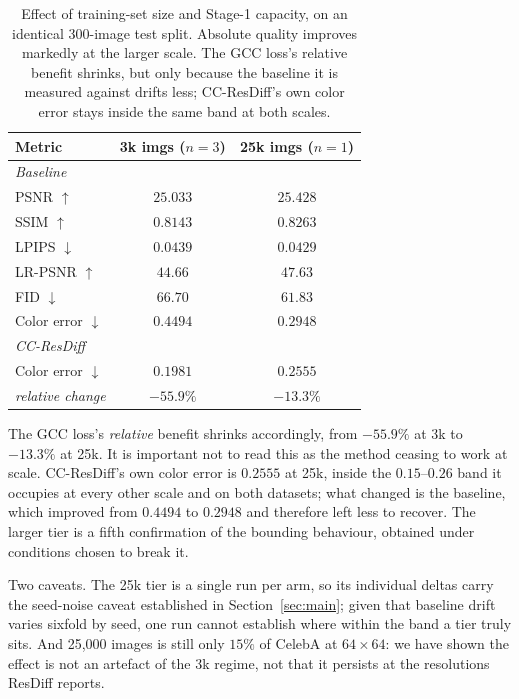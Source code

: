 \documentclass[11pt]{article}
\newcommand{\best}[1]{\textbf{#1}}
\begin{document}
\begin{table}[t]
\centering
\small
\begin{tabular}{lcc}
\toprule
Metric & 3k imgs ($n{=}3$) & 25k imgs ($n{=}1$) \\
\midrule
\multicolumn{3}{l}{\emph{Baseline}}\\
PSNR $\uparrow$          & $25.033$ & \best{$25.428$} \\
SSIM $\uparrow$          & $0.8143$ & \best{$0.8263$} \\
LPIPS $\downarrow$       & $0.0439$ & \best{$0.0429$} \\
LR-PSNR $\uparrow$       & $44.66$  & \best{$47.63$} \\
FID $\downarrow$         & $66.70$  & \best{$61.83$} \\
Color error $\downarrow$ & $0.4494$ & \best{$0.2948$} \\
\midrule
\multicolumn{3}{l}{\emph{CC-ResDiff}}\\
Color error $\downarrow$ & $0.1981$ & $0.2555$ \\
\emph{relative change}   & \emph{$-55.9\%$} & \emph{$-13.3\%$} \\
\bottomrule
\end{tabular}
\caption{Effect of training-set size and Stage-1 capacity, on an identical
300-image test split. Absolute quality improves markedly at the larger scale.
The GCC loss's relative benefit shrinks, but only because the baseline it is
measured against drifts less; CC-ResDiff's own color error stays inside the same
band at both scales.}
\label{tab:scale}
\end{table}

The GCC loss's \emph{relative} benefit shrinks accordingly, from $-55.9\%$ at 3k
to $-13.3\%$ at 25k. It is important not to read this as the method ceasing to
work at scale. CC-ResDiff's own color error is $0.2555$ at 25k, inside the
$0.15$--$0.26$ band it occupies at every other scale and on both datasets; what
changed is the baseline, which improved from $0.4494$ to $0.2948$ and therefore
left less to recover. The larger tier is a fifth confirmation of the bounding
behaviour, obtained under conditions chosen to break it.

Two caveats. The 25k tier is a single run per arm, so its individual deltas carry
the seed-noise caveat established in Section~\ref{sec:main}; given that baseline
drift varies sixfold by seed, one run cannot establish where within the band a
tier truly sits. And 25{,}000 images is still only $15\%$ of CelebA at
$64\times64$: we have shown the effect is not an artefact of the 3k regime, not
that it persists at the resolutions ResDiff reports.
\end{document}
